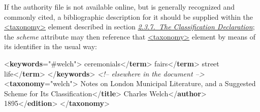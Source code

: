 If the authority file is not available online, but is generally recognized and commonly cited, a bibliographic description for it should be supplied within the \hyperref[TEI.taxonomy]{<taxonomy>} element described in section \textit{\hyperref[HD55]{2.3.7.\ The Classification Declaration}}; the {\itshape scheme} attribute may then reference that \hyperref[TEI.taxonomy]{<taxonomy>} element by means of its identifier in the usual way: \par\bgroup{}\exampleFont \begin{shaded}\noindent\mbox{}{<\textbf{keywords}\hspace*{1em}{scheme}="{\#welch}">}\mbox{}\newline 
{}ceremonials{</\textbf{term}>}\mbox{}\newline 
{}fairs{</\textbf{term}>}\mbox{}\newline 
{}street life{</\textbf{term}>}\mbox{}\newline 
{</\textbf{keywords}>}\mbox{}\newline 
\textit{<!-- elsewhere in the document -->}\mbox{}\newline 
{<\textbf{taxonomy}\hspace*{1em}{xml:id}="{welch}">}\mbox{}\newline 
{}\mbox{}\newline 
\hspace*{1em}Notes on London Municipal Literature, and a Suggested\mbox{}\newline 
\hspace*{1em}\hspace*{1em}\hspace*{1em}\hspace*{1em} Scheme for Its Classification{</\textbf{title}>}\mbox{}\newline 
\hspace*{1em}Charles Welch{</\textbf{author}>}\mbox{}\newline 
\hspace*{1em}1895{</\textbf{edition}>}\mbox{}\newline 
{}\mbox{}\newline 
{</\textbf{taxonomy}>}\end{shaded}\egroup\par \par
